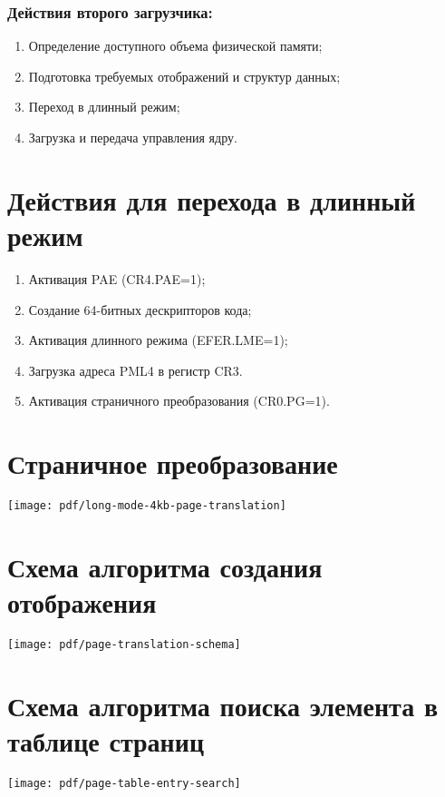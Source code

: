 \documentclass[12pt]{article}
\begin{document}
\subsubsection{Действия второго загрузчика:}
\begin{enumerate}
\item Определение доступного объема физической памяти;
\item Подготовка требуемых отображений и структур данных;
\item Переход в длинный режим;
\item Загрузка и передача управления ядру.
\end{enumerate}


\section{\textbf{Действия для перехода в длинный режим}}
\begin{enumerate}
\item Активация PAE (CR4.PAE=1);
\item Создание 64-битных дескрипторов кода;
\item Активация длинного режима (EFER.LME=1);
\item Загрузка адреса PML4 в регистр CR3.
\item Активация страничного преобразования (CR0.PG=1).
\end{enumerate}


\section{\textbf{Страничное преобразование}}
\texttt{[image: pdf/long-mode-4kb-page-translation]}


\section{\textbf{Схема алгоритма создания отображения}}
\begin{center}
\texttt{[image: pdf/page-translation-schema]}
\end{center}


\section{\textbf{Схема алгоритма поиска элемента в таблице страниц}}
\begin{center}
\texttt{[image: pdf/page-table-entry-search]}
\end{center}
\end{document}
